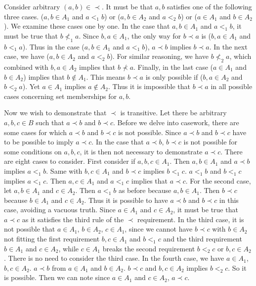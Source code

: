 \documentclass{article}
\begin{document}
\begin{enumerate}
\medskip

Consider arbitrary $(a,b) \in \prec$. It must be that $a,b$ satisfies one of the following three cases. ($a, b \in A_1$ and $a <_{1} b$) or ($a,b \in A_2$ and $a <_{2} b$) or ($a \in A_1$ and $b \in A_2$). We examine these cases one by one. In the case that $a, b \in A_1$ and $a <_{1} b$, it must be true that $b \not <_{1} a$. Since $b,a \in A_1$, the only way for $b \prec a$ is ($b, a \in A_1$ and $b <_{1} a$). Thus in the case ($a, b \in A_1$ and $a <_{1} b$), $a \prec b$ implies $b \prec a$. In the next case, we have ($a,b \in A_2$ and $a <_{2} b$). For similar reasoning, we have $b \not <_{2} a$, which combined with $b,a \in A_2$ implies that $b \not \prec a$. Finally, in the last case ($a \in A_1$ and $b \in A_2$) implies that $b \notin A_1$. This means $b \prec a$ is only possible if ($b,a \in A_2$ and $b <_{2} a$). Yet $a \in A_1$ implies $a \notin A_2$. Thus it is impossible that $b \prec a$ in all possible cases concerning set memberships for $a,b$.

\medskip

Now we wish to demonstrate that $\prec$ is transitive. Let there be arbitrary $a,b,c \in B$ such that $a \prec b$ and $b \prec c$. Before we delve into casework, there are some cases for which $a \prec b$ and $b \prec c$ is not possible. Since $a \prec b$ and $b \prec c$ have to be possible to imply $a \prec c$. In the case that $a \prec b$, $b \prec c$ is not possible for some conditions on $a,b,c$, it is then not necessary to demonstrate $a \prec c$. There are eight cases to consider. First consider if $a,b,c \in A_1$. Then $a,b \in A_1$ and $a \prec b$ implies $a <_{1} b$. Same with $b,c \in A_1$ and $b \prec c$ implies $b <_{1} c$. $a <_{1} b$ and $b <_{1} c$ implies $a <_{1} c$. Then $a,c \in A_1$ and $a <_{1} c$ implies that $a \prec c$. For the second case, let $a,b \in A_1$ and $c \in A_2$. Then $a <_{1} b$ as before because $a,b \in A_1$. Then $b \prec c$ because $b \in A_1$ and $c \in A_2$. Thus it is possible to have $a \prec b$ and $b \prec c$ in this case, avoiding a vacuous truth.  Since $a \in A_1$ and $c \in A_2$, it must be true that $a \prec c$ as it satisfies the third rule of the $\prec$ requirement. In the third case, it is not possible that $a \in A_1$, $b \in A_2$, $c \in A_1$, since we cannot have $b \prec c$ with $b \in A_2$ not fitting the first requirement $b,c \in A_1$ and $b <_{1} c$ and the third requirement $b \in A_{1}$ and $c \in A_{2}$, while $c \in A_1$ breaks the second requirement $b <_{2} c$ or $b,c \in A_{2}$. There is no need to consider the third case. In the fourth case, we have $a \in A_1$, $b,c \in A_2$. $a \prec b$ from $a \in A_1$ and $b \in A_2$. $b \prec c$ and $b,c \in A_2$ implies $b <_{2} c$. So it is possible. Then we can note since $a \in A_1$ and $c \in A_2$, $a \prec c$. 


\end{enumerate}
\end{document}

